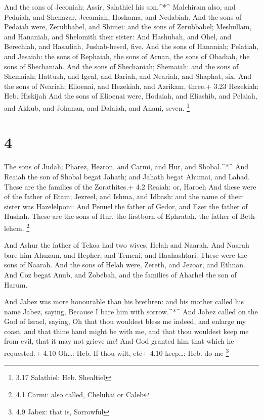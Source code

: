  And the sons of Jeconiah; Assir, Salathiel his
son,\^{}*\^{}  Malchiram also, and Pedaiah, and Shenazar,
Jecamiah, Hoshama, and Nedabiah.  And the sons of Pedaiah
were, Zerubbabel, and Shimei: and the sons of Zerubbabel; Meshullam, and
Hananiah, and Shelomith their sister:  And Hashubah, and
Ohel, and Berechiah, and Hasadiah, Jushab-hesed, five.  And
the sons of Hananiah; Pelatiah, and Jesaiah: the sons of Rephaiah, the
sons of Arnan, the sons of Obadiah, the sons of Shechaniah.
 And the sons of Shechaniah; Shemaiah: and the sons of
Shemaiah; Hattush, and Igeal, and Bariah, and Neariah, and Shaphat, six.
 And the sons of Neariah; Elioenai, and Hezekiah, and
Azrikam, three.+ 3.23 Hezekiah: Heb. Hiskijah  And the sons
of Elioenai were, Hodaiah, and Eliashib, and Pelaiah, and Akkub, and
Johanan, and Dalaiah, and Anani, seven. \footnote{3.17 Salathiel: Heb.
  Shealtiel}

\hypertarget{section-3}{%
\section{4}\label{section-3}}

 The sons of Judah; Pharez, Hezron, and Carmi, and Hur, and
Shobal.\^{}*\^{}  And Reaiah the son of Shobal begat Jahath;
and Jahath begat Ahumai, and Lahad. These are the families of the
Zorathites.+ 4.2 Reaiah: or, Haroeh  And these were of the
father of Etam; Jezreel, and Ishma, and Idbash: and the name of their
sister was Hazelelponi:  And Penuel the father of Gedor, and
Ezer the father of Hushah. These are the sons of Hur, the firstborn of
Ephratah, the father of Beth-lehem. \footnote{4.1 Carmi: also called,
  Chelubai or Caleb}

 And Ashur the father of Tekoa had two wives, Helah and
Naarah.  And Naarah bare him Ahuzam, and Hepher, and Temeni,
and Haahashtari. These were the sons of Naarah.  And the
sons of Helah were, Zereth, and Jezoar, and Ethnan.  And Coz
begat Anub, and Zobebah, and the families of Aharhel the son of Harum.

 And Jabez was more honourable than his brethren: and his
mother called his name Jabez, saying, Because I bare him with
sorrow.\^{}*\^{}  And Jabez called on the God of Israel,
saying, Oh that thou wouldest bless me indeed, and enlarge my coast, and
that thine hand might be with me, and that thou wouldest keep me from
evil, that it may not grieve me! And God granted him that which he
requested.+ 4.10 Oh\ldots: Heb. If thou wilt, etc+ 4.10 keep\ldots: Heb.
do me \footnote{4.9 Jabez: that is, Sorrowful}

